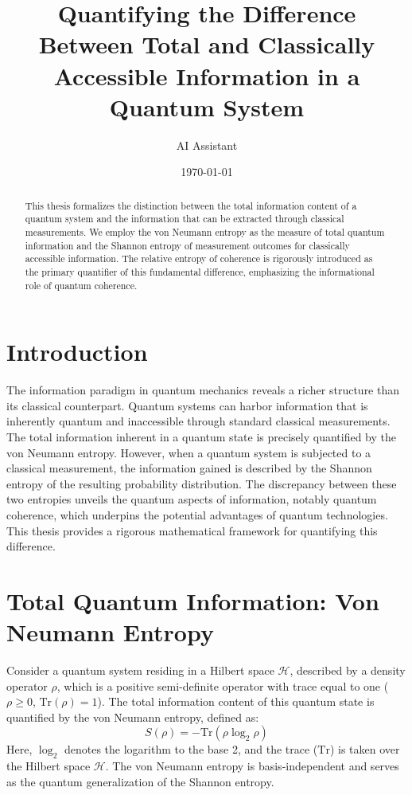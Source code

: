 \documentclass{article}
\title{Quantifying the Difference Between Total and Classically Accessible Information in a Quantum System}
\author{AI Assistant}
\date{\today}
\theoremstyle{definition}
\begin{document}
	
	\maketitle
	
	\begin{abstract}
		This thesis formalizes the distinction between the total information content of a quantum system and the information that can be extracted through classical measurements. We employ the von Neumann entropy as the measure of total quantum information and the Shannon entropy of measurement outcomes for classically accessible information. The relative entropy of coherence is rigorously introduced as the primary quantifier of this fundamental difference, emphasizing the informational role of quantum coherence.
	\end{abstract}
	
	\section{Introduction}
	
	The information paradigm in quantum mechanics reveals a richer structure than its classical counterpart. Quantum systems can harbor information that is inherently quantum and inaccessible through standard classical measurements. The total information inherent in a quantum state is precisely quantified by the von Neumann entropy. However, when a quantum system is subjected to a classical measurement, the information gained is described by the Shannon entropy of the resulting probability distribution. The discrepancy between these two entropies unveils the quantum aspects of information, notably quantum coherence, which underpins the potential advantages of quantum technologies. This thesis provides a rigorous mathematical framework for quantifying this difference.
	
	\section{Total Quantum Information: Von Neumann Entropy}
	
	Consider a quantum system residing in a Hilbert space $\mathcal{H}$, described by a density operator $\rho$, which is a positive semi-definite operator with trace equal to one ($\rho \ge 0$, $\text{Tr}(\rho) = 1$). The total information content of this quantum state is quantified by the von Neumann entropy, defined as:
	\begin{equation}
		S(\rho) = -\text{Tr}(\rho \log_2 \rho)
		\label{eq:von_neumann_entropy}
	\end{equation}
	Here, $\log_2$ denotes the logarithm to the base 2, and the trace ($\text{Tr}$) is taken over the Hilbert space $\mathcal{H}$. The von Neumann entropy is basis-independent and serves as the quantum generalization of the Shannon entropy.
	
\end{document}
